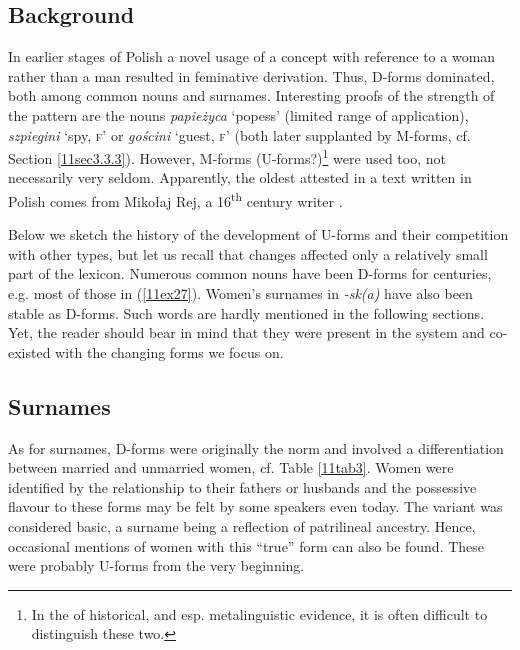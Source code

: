 \documentclass[output=paper,colorlinks,citecolor=brown]{langscibook}
\begin{document}
\subsection{Background} \label{11sec4.1}

In earlier stages of Polish a novel usage of a concept with reference to a woman rather than a man resulted in feminative derivation. Thus, D-forms dominated, both among common nouns and surnames. Interesting proofs of the strength of the pattern are the nouns\emph{ papieżyca} `popess' (limited range of application), \emph{szpiegini} `spy, \textsc{f}' or \emph{gościni} `guest, \textsc{f}' (both later supplanted by M-forms, cf. Section \ref{11sec3.3.3}). However, M-forms (U-forms?)\footnote{In the  of historical, and esp. metalinguistic evidence, it is often difficult to distinguish these two.} were used too, not necessarily very seldom. Apparently, the oldest attested  in a text written in Polish comes from Mikołaj Rej, a 16\textsuperscript{th} century writer \citep[65]{nitsch1951}.

Below we sketch the history of the development of U-forms and their competition with other types, but let us recall that changes affected only a relatively small part of the lexicon. Numerous common nouns have been D-forms for centuries, e.g. most of those in (\ref{11ex27}). Women's surnames in \emph{-sk(a)} have also been stable as D-forms. Such words are hardly mentioned in the following sections. Yet, the reader should bear in mind that they were present in the system and co-existed with the changing forms we focus on.

\subsection{Surnames} \label{11sec4.2}

As for surnames, D-forms were originally the norm and involved a differentiation between married and unmarried women, cf. Table \ref{11tab3}. Women were identified by the relationship to their fathers or husbands and the possessive flavour to these forms may be felt by some speakers even today. The  variant was considered basic, a surname being a reflection of patrilineal ancestry. Hence, occasional mentions of women with this ``true'' form can also be found. These were probably U-forms from the very beginning.
\end{document}
